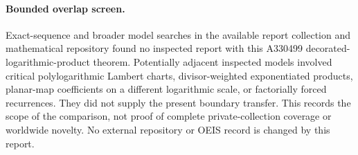 \documentclass[11pt]{article}
\theoremstyle{definition}\newtheorem{definition}[theorem]{Definition}
\theoremstyle{remark}\newtheorem{remark}[theorem]{Remark}
\begin{document}
\paragraph{Bounded overlap screen.}
Exact-sequence and broader model searches in the available report
collection and mathematical repository found no inspected report
with this A330499 decorated-logarithmic-product theorem. Potentially
adjacent inspected models involved critical polylogarithmic Lambert
charts, divisor-weighted exponentiated products, planar-map
coefficients on a different logarithmic scale, or factorially forced
recurrences. They did not supply the present boundary transfer.
This records the scope of the comparison, not proof of complete
private-collection coverage or worldwide novelty. No external
repository or OEIS record is changed by this report.
\end{document}
